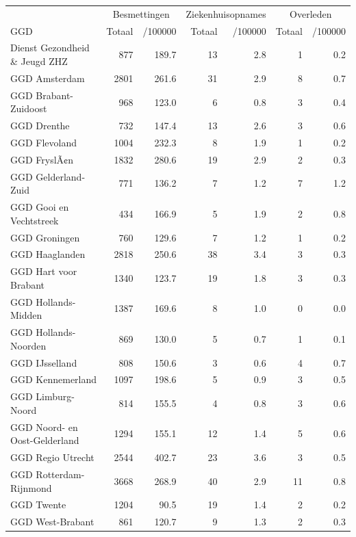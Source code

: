 \documentclass[
  english,
  man,floatsintext]{apa6}
\begin{document}
\begin{table}
\centering\begingroup\fontsize{10}{12}\selectfont

\begin{threeparttable}
\begin{tabular}{lrrrrrr}
\toprule
\multicolumn{1}{c}{ } & \multicolumn{2}{c}{Besmettingen} & \multicolumn{2}{c}{Ziekenhuisopnames} & \multicolumn{2}{c}{Overleden} \\
\cmidrule(l{3pt}r{3pt}){2-3} \cmidrule(l{3pt}r{3pt}){4-5} \cmidrule(l{3pt}r{3pt}){6-7}
GGD & Totaal & /100000 & Totaal & /100000 & Totaal & /100000\\
\midrule
Dienst Gezondheid \& Jeugd ZHZ & 877 & 189.7 & 13 & 2.8 & 1 & 0.2\\
GGD Amsterdam & 2801 & 261.6 & 31 & 2.9 & 8 & 0.7\\
GGD Brabant-Zuidoost & 968 & 123.0 & 6 & 0.8 & 3 & 0.4\\
GGD Drenthe & 732 & 147.4 & 13 & 2.6 & 3 & 0.6\\
GGD Flevoland & 1004 & 232.3 & 8 & 1.9 & 1 & 0.2\\
GGD FryslÃ¢n & 1832 & 280.6 & 19 & 2.9 & 2 & 0.3\\
GGD Gelderland-Zuid & 771 & 136.2 & 7 & 1.2 & 7 & 1.2\\
GGD Gooi en Vechtstreek & 434 & 166.9 & 5 & 1.9 & 2 & 0.8\\
GGD Groningen & 760 & 129.6 & 7 & 1.2 & 1 & 0.2\\
GGD Haaglanden & 2818 & 250.6 & 38 & 3.4 & 3 & 0.3\\
GGD Hart voor Brabant & 1340 & 123.7 & 19 & 1.8 & 3 & 0.3\\
GGD Hollands-Midden & 1387 & 169.6 & 8 & 1.0 & 0 & 0.0\\
GGD Hollands-Noorden & 869 & 130.0 & 5 & 0.7 & 1 & 0.1\\
GGD IJsselland & 808 & 150.6 & 3 & 0.6 & 4 & 0.7\\
GGD Kennemerland & 1097 & 198.6 & 5 & 0.9 & 3 & 0.5\\
GGD Limburg-Noord & 814 & 155.5 & 4 & 0.8 & 3 & 0.6\\
GGD Noord- en Oost-Gelderland & 1294 & 155.1 & 12 & 1.4 & 5 & 0.6\\
GGD Regio Utrecht & 2544 & 402.7 & 23 & 3.6 & 3 & 0.5\\
GGD Rotterdam-Rijnmond & 3668 & 268.9 & 40 & 2.9 & 11 & 0.8\\
GGD Twente & 1204 & 90.5 & 19 & 1.4 & 2 & 0.2\\
GGD West-Brabant & 861 & 120.7 & 9 & 1.3 & 2 & 0.3\\

\end{tabular}
\end{threeparttable}
\end{table}
\end{document}
